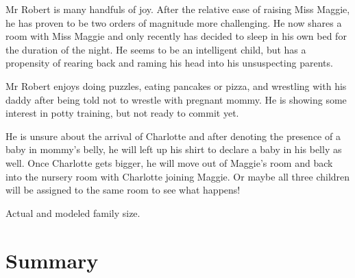 \documentclass{article}
\makeatletter
\newenvironment{figurehere}
  {\def\@captype{figure}}
  {}
\makeatother
\begin{document}
\begin{multicols}{2}
Mr Robert is many handfuls of joy.  After the relative ease of raising Miss
Maggie, he has proven to be two orders of magnitude more challenging.  He now
shares a room with Miss Maggie and only recently has decided to sleep in his own
bed for the duration of the night. He seems to be an intelligent child, but has
a propensity of rearing back and raming his head into his unsuspecting parents. 

Mr Robert enjoys doing puzzles, eating pancakes or pizza, and wrestling with his
daddy after being told not to wrestle with pregnant mommy.  He is showing some
interest in potty training, but not ready to commit yet.

He is unsure about the arrival of Charlotte and after denoting the presence of a
baby in mommy's belly, he will left up his shirt to declare a baby in his belly
as well.  Once Charlotte gets bigger, he will move out of Maggie's room and back
into the nursery room with Charlotte joining Maggie.  Or maybe all three
children will be assigned to the same room to see what happens!

\begin{figurehere}
 \centering   
 \caption{Actual and modeled family size.}
\end{figurehere}

\section{Summary}


\end{multicols}
\end{document}
